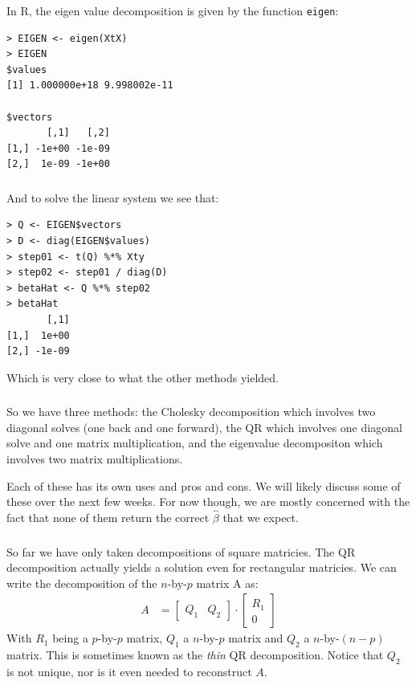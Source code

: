\begin{frame}[fragile] \frametitle{}

In R, the eigen value decomposition is given by the function
\texttt{eigen}:
\begin{verbatim}
> EIGEN <- eigen(XtX)
> EIGEN
$values
[1] 1.000000e+18 9.998002e-11

$vectors
       [,1]   [,2]
[1,] -1e+00 -1e-09
[2,]  1e-09 -1e+00
\end{verbatim}

\end{frame}

\begin{frame}[fragile] \frametitle{}

And to solve the linear system we see that:
\begin{verbatim}
> Q <- EIGEN$vectors
> D <- diag(EIGEN$values)
> step01 <- t(Q) %*% Xty
> step02 <- step01 / diag(D)
> betaHat <- Q %*% step02
> betaHat
       [,1]
[1,]  1e+00
[2,] -1e-09
\end{verbatim}
Which is very close to what the other methods yielded.

\end{frame}

\begin{frame}[fragile] \frametitle{}

So we have three methods: the Cholesky decomposition which involves
two diagonal solves (one back and one forward), the QR which
involves one diagonal solve and one matrix multiplication,
and the eigenvalue decompositon which involves two matrix
multiplications.

\pause Each of these has its own uses and pros and cons. We
will likely discuss some of these over the next few weeks.
For now though, we are mostly concerned with the fact that
none of them return the correct $\widehat{\beta}$ that we
expect.

\end{frame}

\begin{frame}[fragile] \frametitle{}

So far we have only taken decompositions of square matricies.
The QR decomposition actually yields a solution even for rectangular
matricies. We can write the decomposition of the $n$-by-$p$
matrix A as:
\begin{align*}
A &= \left[ \begin{array}{cc} Q_1 & Q_2 \end{array} \right] \cdot
\left[ \begin{array}{c} R_1 \\ 0 \end{array} \right]
\end{align*}
With $R_1$ being a $p$-by-$p$ matrix, $Q_1$ a $n$-by-$p$ matrix
and $Q_2$ a $n$-by-$(n-p)$ matrix. This is sometimes known as
the \textit{thin} QR decomposition. Notice that $Q_2$ is not unique,
nor is it even needed to reconstruct $A$.

\end{frame}

